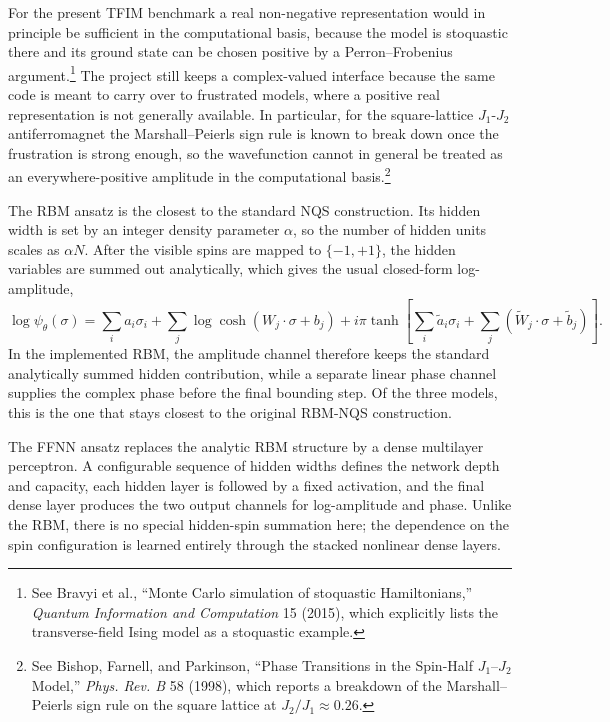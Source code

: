 \documentclass[11pt,a4paper]{article}
\begin{document}
For the present TFIM benchmark a real non-negative representation would in principle be sufficient in the computational basis, because the model is stoquastic there and its ground state can be chosen positive by a Perron--Frobenius argument.\footnote{See Bravyi et al., ``Monte Carlo simulation of stoquastic Hamiltonians,'' \emph{Quantum Information and Computation} 15 (2015), which explicitly lists the transverse-field Ising model as a stoquastic example.} The project still keeps a complex-valued interface because the same code is meant to carry over to frustrated models, where a positive real representation is not generally available. In particular, for the square-lattice $J_1$-$J_2$ antiferromagnet the Marshall--Peierls sign rule is known to break down once the frustration is strong enough, so the wavefunction cannot in general be treated as an everywhere-positive amplitude in the computational basis.\footnote{See Bishop, Farnell, and Parkinson, ``Phase Transitions in the Spin-Half $J_1$--$J_2$ Model,'' \emph{Phys. Rev. B} 58 (1998), which reports a breakdown of the Marshall--Peierls sign rule on the square lattice at $J_2/J_1 \approx 0.26$.}

The RBM ansatz is the closest to the standard NQS construction. Its hidden width is set by an integer density parameter $\alpha$, so the number of hidden units scales as $\alpha N$. After the visible spins are mapped to $\{-1,+1\}$, the hidden variables are summed out analytically, which gives the usual closed-form log-amplitude,
\begin{equation}
    \log \psi_\theta(\sigma)
    =
    \sum_i a_i \sigma_i
    +
    \sum_j \log \cosh\!\left(W_j \cdot \sigma + b_j\right)
    +
    i \pi \tanh \!\left[
        \sum_i \tilde{a}_i \sigma_i
        +
        \sum_j \left(\tilde{W}_j \cdot \sigma + \tilde{b}_j\right)
    \right].
\end{equation}
In the implemented RBM, the amplitude channel therefore keeps the standard analytically summed hidden contribution, while a separate linear phase channel supplies the complex phase before the final bounding step. Of the three models, this is the one that stays closest to the original RBM-NQS construction.

The FFNN ansatz replaces the analytic RBM structure by a dense multilayer perceptron. A configurable sequence of hidden widths defines the network depth and capacity, each hidden layer is followed by a fixed activation, and the final dense layer produces the two output channels for log-amplitude and phase. Unlike the RBM, there is no special hidden-spin summation here; the dependence on the spin configuration is learned entirely through the stacked nonlinear dense layers.
\end{document}
